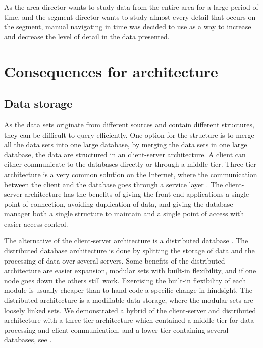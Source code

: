 As the area director wants to study data from the entire area for a large 
period of time, and the segment director wants to study almost every detail 
that occurs on the segment, manual navigating in time was decided to use as a 
way to increase and decrease the level of detail in the data presented.



\section{Consequences for architecture} %
\label{sec:consequences_for_architecture}
\subsection{Data storage} %
\label{sub:data_storage}
As the data sets originate from different sources and contain different
structures, they can be difficult to query efficiently. One option for the structure is to merge all the
data sets into one large database, by merging the data sets in one large
database, the data are structured in an client-server architecture. 
A client can either communicate to the databases directly or through a middle
tier. Three-tier architecture is a very common solution on the Internet, where 
the communication between the client and the database goes through a service 
layer \cite[pp. 294-297]{toftHanseMallaugDatabaser}. The client-server 
architecture has the benefits of giving the front-end applications a single 
point of connection, avoiding duplication of data, and giving the database 
manager both a single structure to maintain and a single point of access with 
easier access control.

The alternative of the client-server architecture is a distributed
database \cite[pp. 301-303]{toftHanseMallaugDatabaser}. The distributed database
architecture is done by splitting the storage of data and the processing of
data over several servers. Some benefits of the distributed architecture are 
easier expansion, modular sets with built-in flexibility, and if one node 
goes down the others still work. Exercising the built-in flexibility of each
module is usually cheaper than to hand-code a specific change in hindsight\cite[pp. 117-130]{Bass:2012:SAP:2392670}. The distributed architecture is a 
modifiable data storage, where the modular sets are loosely linked sets. 
We demonstrated a hybrid of the client-server and distributed
architecture \cite[pp. 297-299]{toftHanseMallaugDatabaser} with a three-tier
architecture which contained a middle-tier for data processing and client
communication, and a lower tier containing several databases, see
.


